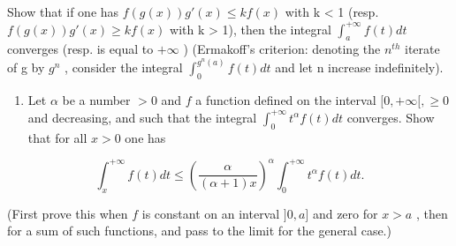 Show that if one has \(f(g(x))g'(x) \leqslant kf(x)\) with k \textless{} 1 (resp. \(f(g(x))g'(x) \geqslant kf(x)\) with k \textgreater{} 1), then the integral \(\int_{a}^{+\infty} f(t) dt\) converges (resp. is equal to \(+\infty\) ) (Ermakoff's criterion: denoting the \(n^{th}\) iterate of g by \(g^n\) , consider the integral \(\int_{0}^{g^n(a)} f(t) dt\) and let n increase indefinitely).

\begin{enumerate}
\def\labelenumi{\arabic{enumi})}
\setcounter{enumi}{8}
\tightlist
\item
  Let \(\alpha\) be a number \(>0\) and \(f\) a function defined on the interval \([0, +\infty[, \geqslant 0\) and decreasing, and such that the integral \(\int_0^{+\infty} t^\alpha f(t) dt\) converges. Show that for all \(x > 0\) one has
\end{enumerate}

\[
\int_ {x} ^ {+ \infty} f (t) d t \leqslant \left(\frac {\alpha}{(\alpha + 1) x}\right) ^ {\alpha} \int_ {0} ^ {+ \infty} t ^ {\alpha} f (t) d t.
\]

(First prove this when \(f\) is constant on an interval \(]0, a]\) and zero for \(x > a\) , then for a sum of such functions, and pass to the limit for the general case.)
\relax{}
\setcounter{exercisegroup}{2}
